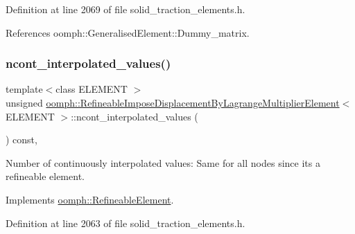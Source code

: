 Definition at line 2069 of file solid\+\_\+traction\+\_\+elements.\+h.



References oomph\+::\+Generalised\+Element\+::\+Dummy\+\_\+matrix.

\mbox{\label{classoomph_1_1RefineableImposeDisplacementByLagrangeMultiplierElement_ab6d8d2ed5da8e699c290e085625d2f45}} 
\subsubsection{\texorpdfstring{ncont\+\_\+interpolated\+\_\+values()}{ncont\_interpolated\_values()}}
{\footnotesize\ttfamily template$<$class E\+L\+E\+M\+E\+NT $>$ \\
unsigned \hyperlink{classoomph_1_1RefineableImposeDisplacementByLagrangeMultiplierElement}{oomph\+::\+Refineable\+Impose\+Displacement\+By\+Lagrange\+Multiplier\+Element}$<$ E\+L\+E\+M\+E\+NT $>$\+::ncont\+\_\+interpolated\+\_\+values (\begin{DoxyParamCaption}{ }\end{DoxyParamCaption}) const\hspace{0.3cm}{\ttfamily [inline]}, {\ttfamily [virtual]}}



Number of continuously interpolated values\+: Same for all nodes since it\textquotesingle{}s a refineable element. 



Implements \hyperlink{classoomph_1_1RefineableElement_a53e171a18c9f43f1db90a6876516a073}{oomph\+::\+Refineable\+Element}.



Definition at line 2063 of file solid\+\_\+traction\+\_\+elements.\+h.

